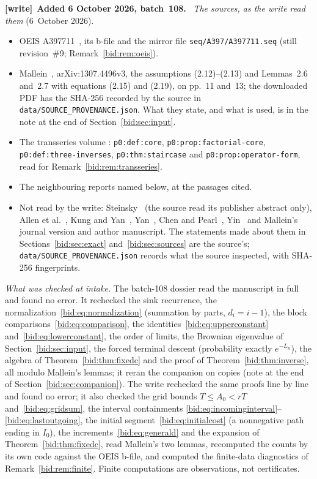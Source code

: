 \documentclass[11pt,letterpaper]{article}
\numberwithin{equation}{section}
\theoremstyle{remark}\newtheorem{remark}[theorem]{Remark}
\newcommand{\file}[1]{\nolinkurl{#1}}
\newenvironment{writenote}[1][]{\par\smallskip\begingroup\small
 \noindent\textbf{[write]}\if\relax\detokenize{#1}\relax\else~\textbf{#1.}\fi\ }%
 {\par\endgroup\smallskip}
\begin{document}
\begin{writenote}[Added 6 October 2026, batch~108]
\emph{The sources, as the write read them} (6~October 2026).
\begin{itemize}\raggedright
\item OEIS A397711~\cite{oeis}, its b-file and the mirror file
 \file{seq/A397/A397711.seq} (still revision~\#9; Remark~\ref{bid:rem:oeis}).
\item Mallein~\cite{mallein}, arXiv:1307.4496v3, the assumptions (2.12)--(2.13)
 and Lemmas~2.6 and~2.7 with equations (2.15) and (2.19), on pp.~11 and~13;
 the downloaded PDF has the SHA-256 recorded by the source in
 \file{data/SOURCE_PROVENANCE.json}. What they state, and what is used, is in
 the note at the end of Section~\ref{bid:sec:input}.
\item The transseries volume
 :
 \file{p0:def:core}, \file{p0:prop:factorial-core},
 \file{p0:def:three-inverses}, \file{p0:thm:staircase} and
 \file{p0:prop:operator-form}, read for Remark~\ref{bid:rem:transseries}.
\item The neighbouring reports named below, at the passages cited.
\item Not read by the write: Steinsky~\cite{steinsky} (the source read its
 publisher abstract only), Allen et al.~\cite{allen}, Kung and
 Yan~\cite{kungyan}, Yan~\cite{yan}, Chen and Pearl~\cite{chenpearl},
 Yin~\cite{yin} and Mallein's journal version and author manuscript. The
 statements made about them in Sections~\ref{bid:sec:exact}
 and~\ref{bid:sec:sources} are the source's;
 \file{data/SOURCE_PROVENANCE.json} records what the source inspected, with
 SHA-256 fingerprints.
\end{itemize}

\emph{What was checked at intake.} The batch-108 dossier read the manuscript
in full and found no error. It rechecked the sink recurrence, the
normalization~\eqref{bid:eq:normalization} (summation by parts, $d_i=i-1$),
the block comparisons~\eqref{bid:eq:comparison}, the
identities~\eqref{bid:eq:upperconstant} and~\eqref{bid:eq:lowerconstant}, the
order of limits, the Brownian eigenvalue of Section~\ref{bid:sec:input}, the
forced terminal descent (probability exactly $e^{-L_n}$), the algebra of
Theorem~\ref{bid:thm:fixedc} and the proof of Theorem~\ref{bid:thm:inverse},
all modulo Mallein's lemmas; it reran the companion on copies (note at the
end of Section~\ref{bid:sec:companion}). The write rechecked the same proofs
line by line and found no error; it also checked the grid bounds
$T\le A_0<rT$ and~\eqref{bid:eq:gridsum}, the interval containments
\eqref{bid:eq:incominginterval}--\eqref{bid:eq:lastoutgoing}, the initial
segment~\eqref{bid:eq:initialcost} (a nonnegative path ending in $I_0$), the
increments~\eqref{bid:eq:generald} and the expansion of
Theorem~\ref{bid:thm:fixedc}, read Mallein's two lemmas, recomputed the counts
by its own code against the OEIS b-file, and computed the finite-data
diagnostics of Remark~\ref{bid:rem:finite}. Finite computations are
observations, not certificates.


\end{writenote}
\end{document}
